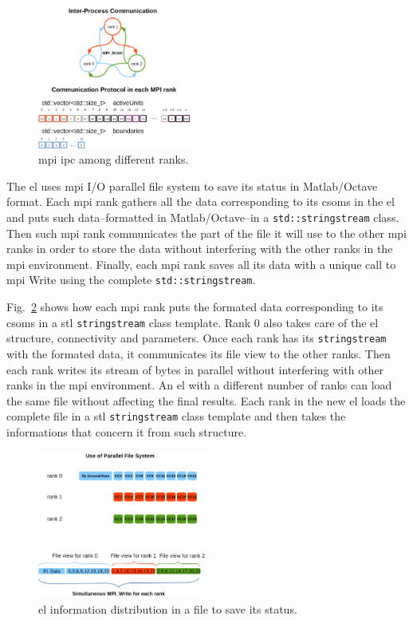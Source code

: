 \documentclass[10pt,journal,compsoc]{IEEEtran}
\begin{document}
\begin{figure}[h!]
    \centering
    \includegraphics[width=0.45\textwidth]{BCast.png}
    \caption{\gls{mpi} \gls{ipc} among different ranks.}
    \label{fig:BCast}
\end{figure}

The \gls{el} uses \gls{mpi} I/O parallel file system to save its status in Matlab/Octave format. Each \gls{mpi} rank gathers all the data corresponding to its \glspl{csom} in the \gls{el} and puts such data--formatted in Matlab/Octave--in a \texttt{std::stringstream} class. Then such \gls{mpi} rank communicates the part of the file it will use to the other \gls{mpi} ranks in order to store the data without interfering with the other ranks in the \gls{mpi} environment. Finally, each \gls{mpi} rank saves all its data with a unique call to \gls{mpi} Write using the complete \texttt{std::stringstream}.

Fig.~\ref{fig:MPI_IO} shows how each \gls{mpi} rank puts the formated data corresponding to its \glspl{csom} in a \gls{stl} \texttt{stringstream} class template. Rank 0 also takes care of the \gls{el} structure, connectivity and parameters. Once each rank has its \texttt{stringstream} with the formated data, it communicates its file view to the other ranks. Then each rank writes its stream of bytes in parallel without interfering with other ranks in the \gls{mpi} environment. An \gls{el} with a different number of ranks can load the same file without affecting the final results. Each rank in the new \gls{el} loads the complete file in a \gls{stl} \texttt{stringstream} class template and then takes the informations that concern it from such structure.

\begin{figure}[h!]
    \centering
    \includegraphics[width=0.5\textwidth]{MPI_IO.png}
    \caption{\gls{el} information distribution in a file to save its status.}
    \label{fig:MPI_IO}
\end{figure}
\end{document}
